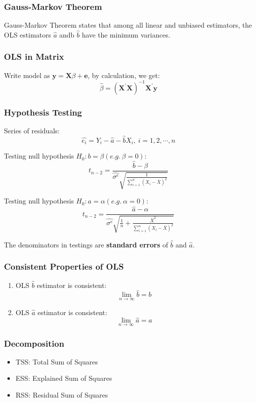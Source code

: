 \subsubsection{Gauss-Markov Theorem}

\begin{theorem}{Gauss-Markov Theorem}
    states that among all linear and unbiased estimators, the OLS estimators $\hat{a}$ andb $\hat{b}$ have the minimum variances.
\end{theorem}

\subsubsection{OLS in Matrix}
Write model as $\mathbf{y} = \mathbf{X}\beta + \mathbf{e}$, by calculation, we get:
\[
    \hat{\beta} = (\mathbf{X}^{\prime}\mathbf{X})^{-1}\mathbf{X}^{\prime}\mathbf{y}
\]

\subsubsection{Hypothesis Testing}
Series of residuals:
\[
    \hat{e_i} = Y_i - \hat{a} - \hat{b}X_i, \ i=1,2,\cdots,n
\]

Testing null hypothesis $H_0: b =\beta (e.g.\ \beta = 0)$:
\[
    t_{n-2} = \frac{\hat{b}-\beta}{\hat{\sigma^e}\sqrt{\frac{1}{\sum_{i=1}^n(X_i-\bar{X})^2}}}
\]

Testing null hypothesis $H_0: a =\alpha (e.g.\ \alpha = 0)$:
\[
    t_{n-2} = \frac{\hat{a}-\alpha}{\hat{\sigma^e}\sqrt{\frac{1}{n}+\frac{\bar{X}^2}{\sum_{i=1}^n(X_i-\bar{X})^2}}}
\]

\begin{note}
    The denominators in testings are \textbf{standard errors} of $\hat{b}$ and $\hat{a}$.
\end{note}

\subsubsection{Consistent Properties of OLS}
\begin{enumerate}
    \item OLS $\hat{b}$ estimator is consistent: \[\lim_{n \to \infty} \hat{b} = b\]
    \item OLS $\hat{a}$ estimator is consistent: \[\lim_{n \to \infty} \hat{a} = a\]
\end{enumerate}

\subsubsection{Decomposition}
\begin{itemize}
    \item TSS: Total Sum of Squares
    \item ESS: Explained Sum of Squares
    \item RSS: Residual Sum of Squares
\end{itemize}

